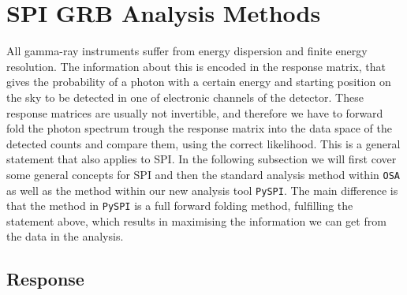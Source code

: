 \documentclass[twocolumn,traditabstract]{aa}
\begin{document}
\section{SPI GRB Analysis Methods}
\label{methods}
All gamma-ray instruments suffer from energy dispersion and finite energy resolution. The information about this is encoded in the response matrix, that gives the probability of a photon with a certain energy and starting position on the sky to be detected in one of electronic channels of the detector. These response matrices are usually not invertible, and therefore we have to forward fold the photon spectrum trough the response matrix into the data space of the detected counts and compare them, using the correct likelihood. This is a general statement that also applies to SPI. In the following subsection we will first cover some general concepts for SPI and then the standard analysis method within {\tt OSA} as well as the method within our new analysis tool {\tt PySPI}. The main difference is that the method in {\tt PySPI} is a full forward folding method, fulfilling the statement above, which results in maximising the information we can get from the data in the analysis.

\subsection{Response}
\label{response}
\end{document}
